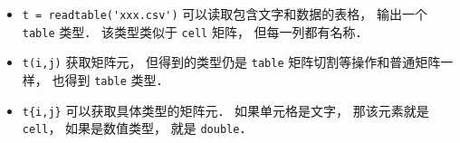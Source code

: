 
\begin{issues}
\issueDraft
\end{issues}

\begin{itemize}
\item \verb|t = readtable('xxx.csv')| 可以读取包含文字和数据的表格， 输出一个 \verb|table| 类型． 该类型类似于 \verb|cell| 矩阵， 但每一列都有名称．
\item \verb|t(i,j)| 获取矩阵元， 但得到的类型仍是 \verb|table| 矩阵切割等操作和普通矩阵一样， 也得到 \verb|table| 类型．
\item \verb|t{i,j}| 可以获取具体类型的矩阵元． 如果单元格是文字， 那该元素就是 \verb|cell|， 如果是数值类型， 就是 \verb|double|．
\end{itemize}
